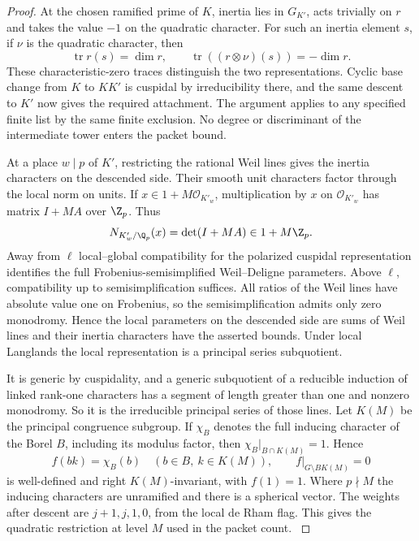 \begin{proof}
At the chosen ramified prime
of \(K\), inertia lies in \(G_{K'}\), acts trivially on \(r\)
and takes the value \(-1\) on the quadratic character.
For such an inertia element \(s\), if \(\nu\) is the quadratic character, then
\[
 \operatorname{tr}r(s)=\dim r,\qquad
 \operatorname{tr}((r\otimes\nu)(s))=-\dim r .
\]
These characteristic-zero traces distinguish the two representations. Cyclic base change
from \(K\) to \(KK'\) is cuspidal by irreducibility there,
and the same descent to \(K'\) now gives the required
attachment. The argument applies to any specified finite
list by the same finite exclusion. No degree or discriminant
of the intermediate tower enters the packet bound.

At a place \(w\mid p\) of \(K'\), restricting the rational
Weil lines gives the inertia characters on the descended
side. Their smooth unit characters factor through the
local norm on units. If \(x\in1+M\mathcal O_{K'_w}\), multiplication by \(x\)
on \(\mathcal O_{K'_w}\) has matrix \(I+MA\) over \(\Z_p\).
Thus
\[
           N_{K'_w/\Q_p}(x)=\det(I+MA)\in1+M\Z_p.
\] Away from \(\ell\)
local--global compatibility for the polarized cuspidal
representation identifies the full Frobenius-semisimplified
Weil--Deligne parameters. Above \(\ell\), compatibility up
to semisimplification suffices. All ratios of the Weil
lines have absolute value one on Frobenius, so the
semisimplification admits only zero monodromy. Hence the
local parameters on the descended side are sums of Weil
lines and their inertia characters have the asserted bounds.
Under local Langlands the local representation is a
principal series subquotient.

It is generic by cuspidality,
and a generic subquotient of a reducible induction of
linked rank-one characters has a segment of length greater
than one and nonzero monodromy. So it is the irreducible
principal series of those lines. Let \(K(M)\) be the principal congruence subgroup. If \(\chi_B\) denotes the full inducing character of the Borel \(B\), including its modulus factor, then \(\chi_B|_{B\cap K(M)}=1\). Hence
\[
 f(bk)=\chi_B(b)\quad(b\in B,\ k\in K(M)),\qquad
 f|_{G\setminus BK(M)}=0
\]
is well-defined and right \(K(M)\)-invariant, with \(f(1)=1\). Where
\(p\nmid M\) the inducing characters are unramified and
there is a spherical vector. The weights after descent
are \(j+1,j,1,0\), from the local de Rham flag. This gives
the quadratic restriction at level \(M\) used in the
packet count.
\hfill\mbox{\cite{blggt,blggt-lg,zelevinsky}}\label{cor:ordinary-count-ii-point-output-6}
\end{proof}
